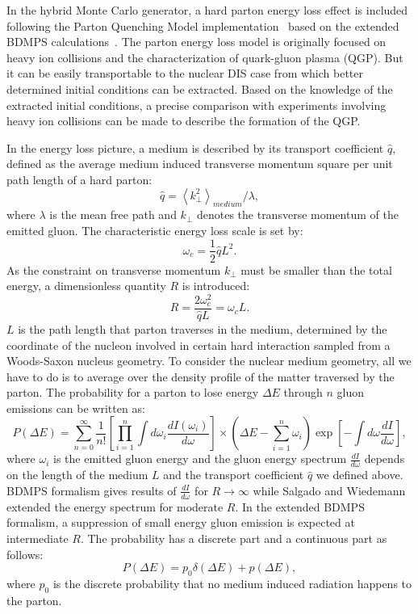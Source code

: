 In the hybrid Monte Carlo generator, a hard parton energy loss effect is
included following the Parton Quenching Model
implementation~\cite{Dupre:2011afa} based on the extended BDMPS
calculations~\cite{Salgado:2003gb}. The parton energy loss model is originally
focused on heavy ion collisions and the characterization of quark-gluon plasma
(QGP). But it can be easily transportable to the nuclear DIS case from which better
determined initial conditions can be extracted. Based on the knowledge
of the extracted initial conditions, a precise comparison with experiments
involving heavy ion collisions can be made to describe the formation of the QGP.

In the energy loss picture, a medium is described by its transport coefficient $\hat{q}$,
defined as the average medium induced transverse momentum square per unit path
length of a hard parton:
\begin{equation}
\hat{q} = \left\langle k^{2}_{\perp}\right\rangle _{medium}/\lambda,
\end{equation}
where $\lambda$ is the mean free path and $k_{\perp}$ denotes the transverse
momentum of the emitted gluon. The characteristic energy loss scale is set by:
\begin{equation}
\omega_{c} = \frac{1}{2}\hat{q}L^{2}.
\end{equation}
As the constraint on transverse momentum $k_{\perp}$ must be smaller than the
total energy, a dimensionless quantity $R$ is introduced:
\begin{equation}
R = \frac{2\omega^{2}_{c}}{\hat{q}L} = \omega_{c}L.
\end{equation}
$L$ is the path length that parton traverses in the medium, determined by the
coordinate of the nucleon involved in certain hard interaction sampled from
a Woods-Saxon nucleus geometry. To consider the nuclear medium geometry, all we
have to do is to average over the density profile of the matter traversed by the
parton. The probability for a parton to lose energy $\Delta E$ through $n$ gluon emissions can be
written as:
\begin{equation}
P(\Delta E)=\sum^{\infty}_{n=0}\frac{1}{n!}[\prod^{n}_{i=1}\int d\omega_{i}\frac{dI(\omega_{i})}{d\omega}]
\times(\Delta E-\sum^{n}_{i=1}\omega_{i})\exp[-\int d\omega\frac{dI}{d\omega}],
\end{equation}
where $\omega_{i}$ is the emitted gluon energy and the gluon energy spectrum
$\frac{dI}{d\omega}$ depends on the length of the medium $L$ and the transport coefficient $\hat{q}$ we defined above. BDMPS formalism
gives results of $\frac{dI}{d\omega}$ for $R\rightarrow \infty$ while Salgado and Wiedemann extended the
energy spectrum for moderate $R$. In the extended BDMPS formalism, a suppression of small energy
gluon emission is expected at intermediate $R$. The probability has a discrete part and a continuous part as
follows:
\begin{equation}
P(\Delta E) = p_{0}\delta(\Delta E) + p(\Delta E),
\end{equation}
where $p_{0}$ is the discrete probability that no medium induced radiation
happens to the parton.

